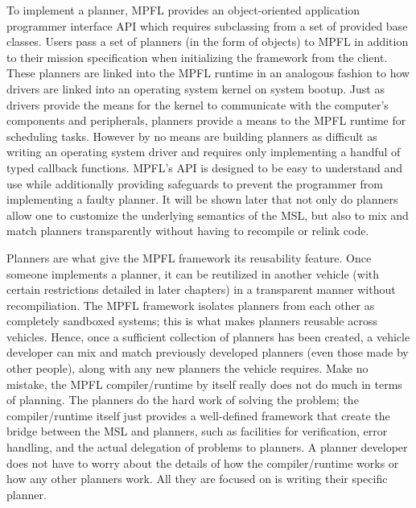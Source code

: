 
To implement a planner, MPFL provides an object-oriented application programmer interface API which requires subclassing from a set of provided base classes. Users pass a set of planners (in the form of objects) to MPFL in addition to their mission specification when initializing the framework from the client. These planners are linked into the MPFL runtime in an analogous fashion to how drivers are linked into an operating system kernel on system bootup. Just as drivers provide the means for the kernel to communicate with the computer's components and peripherals, planners provide a means to the MPFL runtime for scheduling tasks. However by no means are building planners as difficult as writing an operating system driver and requires only implementing a handful of typed callback functions. MPFL's API is designed to be easy to understand and use while additionally providing safeguards to prevent the programmer from implementing a faulty planner. It will be shown later that not only do planners allow one to customize the underlying semantics of the MSL, but also to mix and match planners transparently without having to recompile or relink code.

Planners are what give the MPFL framework its reusability feature. Once someone implements a planner, it can be reutilized in another vehicle (with certain restrictions detailed in later chapters) in a transparent manner without recompiliation. The MPFL framework isolates planners from each other as completely sandboxed systems; this is what makes planners reusable across vehicles. Hence, once a sufficient collection of planners has been created, a vehicle developer can mix and match previously developed planners (even those made by other people), along with any new planners the vehicle requires. Make no mistake, the MPFL compiler/runtime by itself really does not do much in terms of planning. The planners do the hard work of solving the problem; the compiler/runtime itself just provides a well-defined framework that create the bridge between the MSL and planners, such as facilities for verification, error handling, and the actual delegation of problems to planners. A planner developer does not have to worry about the details of how the compiler/runtime works or how any other planners work. All they are focused on is writing their specific planner.

